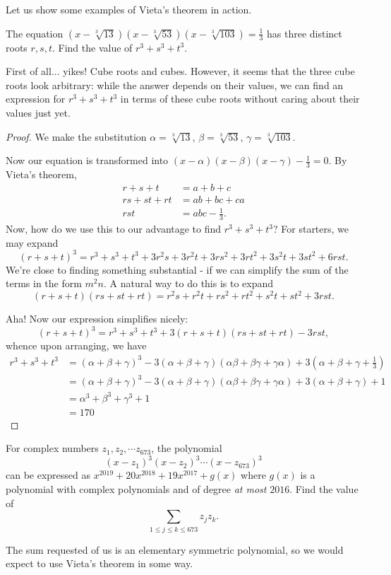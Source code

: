 \documentclass[../main.tex]{subfiles}
\begin{document}
Let us show some examples of Vieta's theorem in action. 
\begin{example}
    The equation $(x-\sqrt[3]{13})(x-\sqrt[3]{53})(x-\sqrt[3]{103})=\frac{1}{3}$ has three distinct roots $r,s,t$. Find the value of $r^3+s^3+t^3$.
\end{example}

First of all... yikes! Cube roots and cubes. However, it seems that the three cube roots look arbitrary: while the answer depends on their values, we can find an expression for $r^3+s^3+t^3$ in terms of these cube roots without caring about their values just yet. 
\begin{proof}
    We make the substitution $\alpha=\sqrt[3]{13}$, $\beta=\sqrt[3]{53}$, $\gamma=\sqrt[3]{103}$.

Now our equation is transformed into $(x-\alpha)(x-\beta)(x-\gamma)-\frac{1}{3}=0$. By Vieta's theorem, 
\begin{align*}
    r+s+t&=a+b+c \\
    rs+st+rt&=ab+bc+ca \\
    rst&=abc-\frac{1}{3}.
\end{align*}
Now, how do we use this to our advantage to find $r^3+s^3+t^3$? For starters, we may expand
$$(r+s+t)^3=r^3+s^3+t^3+3r^2s+3r^2t+3rs^2+3rt^2+3s^2t+3st^2+6rst.$$
We're close to finding something substantial - if we can simplify the sum of the terms in the form $m^2n$. A natural way to do this is to expand
$$(r+s+t)(rs+st+rt)=r^2s+r^2t+rs^2+rt^2+s^2t+st^2+3rst.$$

Aha! Now our expression simplifies nicely:
$$(r+s+t)^3=r^3+s^3+t^3+3(r+s+t)(rs+st+rt)-3rst,$$
whence upon arranging, we have
\begin{align*}
    r^3+s^3+t^3
    &=(\alpha+\beta+\gamma)^3-3(\alpha+\beta+\gamma)(\alpha\beta+\beta\gamma+\gamma\alpha)+3(\alpha+\beta+\gamma+\frac{1}{3})\\
    &=(\alpha+\beta+\gamma)^3-3(\alpha+\beta+\gamma)(\alpha\beta+\beta\gamma+\gamma\alpha)+3(\alpha+\beta+\gamma)+1 \\
    &=\alpha^3+\beta^3+\gamma^3+1 \\
    &=\boxed{170}
\end{align*}
\end{proof}

\begin{example}[2019 AIME I P10]
For complex numbers $z_1, z_2,\cdots z_{673}$, the polynomial
$$(x-z_1)^3(x-z_2)^3\cdots(x-z_673)^3$$
can be expressed as $x^{2019}+20x^{2018}+19x^{2017}+g(x)$ where $g(x)$ is a polynomial with complex polynomials and of degree \textit{at most} $2016$. Find the value of 
$$\sum_{1\leq j\leq k\leq 673}z_jz_k.$$
\end{example}
The sum requested of us is an elementary symmetric polynomial, so we would expect to use Vieta's theorem in some way.
\end{document}
